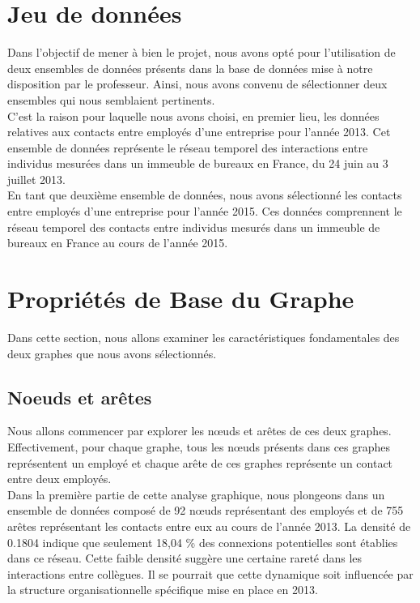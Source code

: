 \documentclass{article}
\begin{document}
\section{Jeu de données}

Dans l'objectif de mener à bien le projet, nous avons opté pour l'utilisation de deux ensembles de données présents dans la base de données mise à notre disposition par le professeur. Ainsi, nous avons convenu de sélectionner deux ensembles qui nous semblaient pertinents. \\

C'est la raison pour laquelle nous avons choisi, en premier lieu, les données relatives aux contacts entre employés d'une entreprise pour l'année 2013. Cet ensemble de données représente le réseau temporel des interactions entre individus mesurées dans un immeuble de bureaux en France, du 24 juin au 3 juillet 2013. \\

En tant que deuxième ensemble de données, nous avons sélectionné les contacts entre employés d'une entreprise pour l'année 2015. Ces données comprennent le réseau temporel des contacts entre individus mesurés dans un immeuble de bureaux en France au cours de l'année 2015.

\section{Propriétés de Base du Graphe}

Dans cette section, nous allons examiner les caractéristiques fondamentales des deux graphes que nous avons sélectionnés.

\subsection{Noeuds et arêtes}

Nous allons commencer par explorer les nœuds et arêtes de ces deux graphes. \\

Effectivement, pour chaque graphe, tous les nœuds présents dans ces graphes représentent un employé et chaque arête de ces graphes représente un contact entre deux employés. \\

Dans la première partie de cette analyse graphique, nous plongeons dans un ensemble de données composé de 92 nœuds représentant des employés et de 755 arêtes représentant les contacts entre eux au cours de l'année 2013. La densité de 0.1804 indique que seulement 18,04 \% des connexions potentielles sont établies dans ce réseau. Cette faible densité suggère une certaine rareté dans les interactions entre collègues. Il se pourrait que cette dynamique soit influencée par la structure organisationnelle spécifique mise en place en 2013. \\
\end{document}
